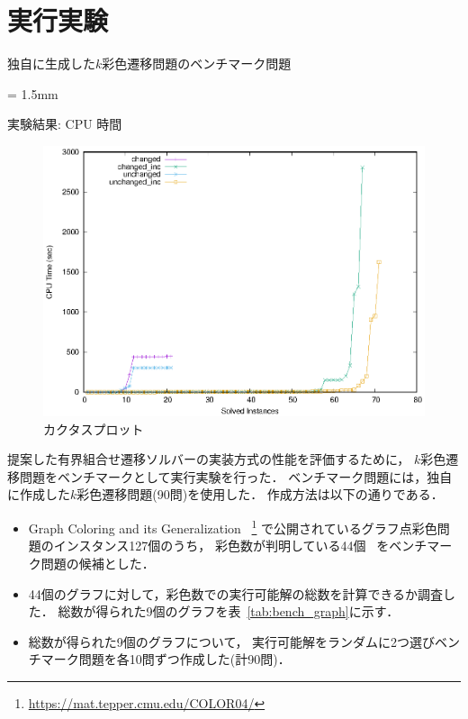 ﻿%
\section{実行実験}\label{chap:experiment}

\begin{table}[t]\footnotesize
  \centering
  \caption{独自に生成した$k$彩色遷移問題のベンチマーク問題}
  \tabcolsep = 1.5mm
  \label{tab:bench_graph}
  
\end{table}

\begin{table}[t]
  \centering
  \scriptsize
  \caption{実験結果: CPU 時間}
  \label{tab:result_time}
  \renewcommand{\arraystretch}{0.6}
  
\end{table}

\begin{figure}[t]
  \centering
  \includegraphics[scale=0.9]{fig/cactus.eps}
  \caption{カクタスプロット}
  \label{fig:cactus}
\end{figure}

提案した有界組合せ遷移ソルバーの実装方式の性能を評価するために，
$k$彩色遷移問題をベンチマークとして実行実験を行った．
%
ベンチマーク問題には，独自に作成した$k$彩色遷移問題(90問)を使用した．
作成方法は以下の通りである．
\begin{itemize}
\item Graph Coloring and its Generalization~%
  \footnote{\url{https://mat.tepper.cmu.edu/COLOR04/}}
  で公開されているグラフ点彩色問題のインスタンス127個のうち，
  彩色数が判明している44個~\cite{DBLP:journals/constraints/TamuraTKB09}
  をベンチマーク問題の候補とした．
\item 44個のグラフに対して，彩色数での実行可能解の総数を計算できるか調査した．
  総数が得られた9個のグラフを表~\ref{tab:bench_graph}に示す．
\item 総数が得られた9個のグラフについて，
  実行可能解をランダムに2つ選びベンチマーク問題を各10問ずつ作成した(計90問)．
\end{itemize}

